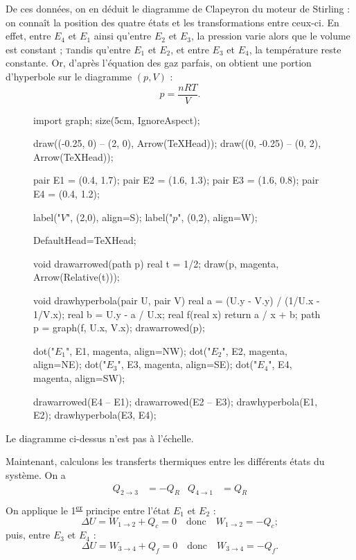 \documentclass[a4paper]{report}
\newcommand{\tsup}[1]{\textsuperscript{\underline{#1}}}
\let\sc\scshape
\begin{document}
\begin{multicols}{2}
		De ces données, on en déduit le diagramme de Clapeyron du moteur de Stirling : on connaît la position des quatre états et les transformations entre ceux-ci.
		En effet, entre $E_4$ et $E_1$ ainsi qu'entre $E_2$ et $E_3$, la pression varie alors que le volume est constant ; {\sc t}andis qu'entre $E_1$ et $E_2$, et entre $E_3$ et $E_4$, la température reste constante. Or, d'après l'équation des gaz parfais, on obtient une portion d'hyperbole sur le diagramme $(p, V)$ : \[
			p = \frac{n R T}{V}
		.\]

		\begin{figure}[H]
			\centering
			\begin{asy}
				import graph;
				size(5cm, IgnoreAspect);

				draw((-0.25, 0) -- (2, 0), Arrow(TeXHead));
				draw((0, -0.25) -- (0, 2), Arrow(TeXHead));

				pair E1 = (0.4, 1.7);
				pair E2 = (1.6, 1.3);
				pair E3 = (1.6, 0.8);
				pair E4 = (0.4, 1.2);

				label("$V$", (2,0), align=S);
				label("$p$", (0,2), align=W);

				DefaultHead=TeXHead;

				void drawarrowed(path p) {
					real t = 1/2;
					draw(p, magenta, Arrow(Relative(t)));
				}

				void drawhyperbola(pair U, pair V) {
					real a = (U.y - V.y) / (1/U.x - 1/V.x);
					real b = U.y - a / U.x;
					real f(real x) { return a / x + b; }
					path p = graph(f, U.x, V.x);
					drawarrowed(p);
				}

				dot("$E_1$", E1, magenta, align=NW);
				dot("$E_2$", E2, magenta, align=NE);
				dot("$E_3$", E3, magenta, align=SE);
				dot("$E_4$", E4, magenta, align=SW);
				
				drawarrowed(E4 -- E1);
				drawarrowed(E2 -- E3);
				drawhyperbola(E1, E2);
				drawhyperbola(E3, E4);
			\end{asy}
		\end{figure}
		
		\centerline{\footnotesize Le diagramme ci-dessus n'est pas à l'échelle.}

		Maintenant, calculons les transferts thermiques entre les différents états du système. On a
		\begin{align*}
			Q_{2\to 3} &= -Q_R & Q_{4\to 1} &= Q_R \\
		\end{align*}
		On applique le 1\tsup{er} principe entre l'état $E_1$ et $E_2$ : \[
			\Delta U = W_{1\to 2} + Q_c = 0 \quad \text{donc}\quad W_{1\to 2} = -Q_c;
		\] puis, entre $E_3$ et $E_4$ : \[
			\Delta U = W_{3\to 4} + Q_f = 0 \quad \text{donc} \quad W_{3\to 4} = -Q_f
		.\]


\end{multicols}
\end{document}
